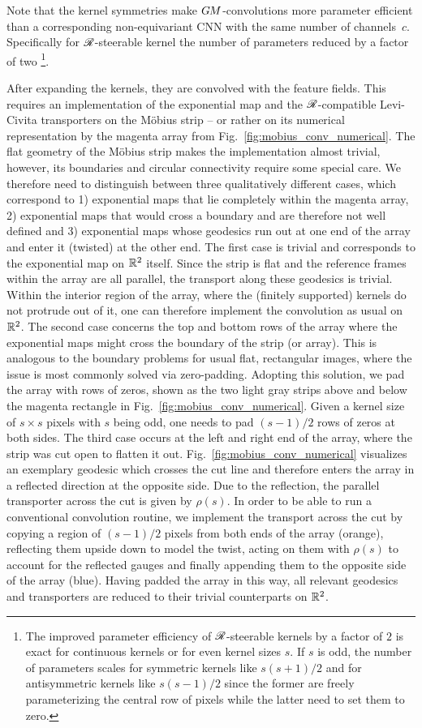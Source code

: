 Note that the kernel symmetries make $G\mkern-1.4muM$-convolutions more parameter efficient than a corresponding non-equivariant CNN with the same number of channels~$c$.
Specifically for $\mathscr{R}$-steerable kernel the number of parameters reduced by a factor of two%
\footnote{
    The improved parameter efficiency of $\mathscr{R}$-steerable kernels by a factor of $2$ is exact for continuous kernels or for even kernel sizes $s$.
    If $s$ is odd, the number of parameters scales for symmetric kernels like $s(s+1)/2$ and for antisymmetric kernels like $s(s-1)/2$ since the former are freely parameterizing the central row of pixels while the latter need to set them to zero.
}.


After expanding the kernels, they are convolved with the feature fields.
This requires an implementation of the exponential map and the $\mathscr{R}$-compatible Levi-Civita transporters on the M\"obius strip -- or rather on its numerical representation by the magenta array from Fig.~\ref{fig:mobius_conv_numerical}.
The flat geometry of the M\"obius strip makes the implementation almost trivial, however, its boundaries and circular connectivity require some special care.
We therefore need to distinguish between three qualitatively different cases, which correspond to
1) exponential maps that lie completely within the magenta array,
2) exponential maps that would cross a boundary and are therefore not well defined and
3) exponential maps whose geodesics run out at one end of the array and enter it (twisted) at the other end.
The first case is trivial and corresponds to the exponential map on $\mathbb{R}^2$ itself.
Since the strip is flat and the reference frames within the array are all parallel, the transport along these geodesics is trivial.
Within the interior region of the array, where the (finitely supported) kernels do not protrude out of it, one can therefore implement the convolution as usual on $\mathbb{R}^2$.
The second case concerns the top and bottom rows of the array where the exponential maps might cross the boundary of the strip (or array).
This is analogous to the boundary problems for usual flat, rectangular images, where the issue is most commonly solved via zero-padding.
Adopting this solution, we pad the array with rows of zeros, shown as the two light gray strips above and below the magenta rectangle in Fig.~\ref{fig:mobius_conv_numerical}.
Given a kernel size of $s\times s$ pixels with $s$ being odd, one needs to pad $(s-1)/2$ rows of zeros at both sides.
The third case occurs at the left and right end of the array, where the strip was cut open to flatten it out.
Fig.~\ref{fig:mobius_conv_numerical} visualizes an exemplary geodesic which crosses the cut line and therefore enters the array in a reflected direction at the opposite side.
Due to the reflection, the parallel transporter across the cut is given by $\rho(s)$.
In order to be able to run a conventional convolution routine, we implement the transport across the cut by copying a region of $(s-1)/2$ pixels from both ends of the array (orange), reflecting them upside down to model the twist, acting on them with $\rho(s)$ to account for the reflected gauges and finally appending them to the opposite side of the array (blue).
Having padded the array in this way, all relevant geodesics and transporters are reduced to their trivial counterparts on $\mathbb{R}^2$.

